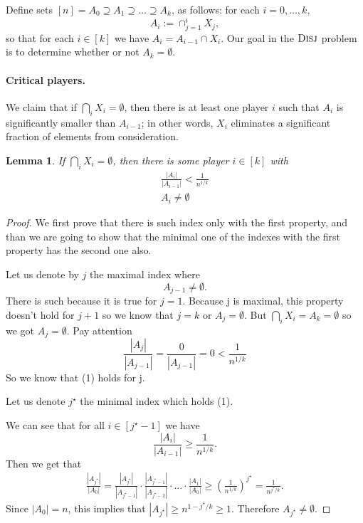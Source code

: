 \documentclass{article}
\newcommand{\coloneq}{:=}
\newcommand{\prob}[1]{\ensuremath{\text{\textsc{#1}}}}
\theoremstyle{plain}
\newtheorem{lemma}[theorem]{Lemma}
\begin{document}
Define  sets $[n] = A_0 \supseteq A_1 \supseteq \ldots \supseteq A_k$, as follows:
for each $i = 0,\ldots,k$,
\begin{equation*}
  A_i \coloneq \cap_{j = 1}^i X_j,
\end{equation*}
so that for each $i \in [k]$ we have $A_i = A_{i-1} \cap X_i$.
Our goal in the $\prob{Disj}$ problem is to determine whether or not $A_k = \emptyset$.

\paragraph{Critical players.}
We claim that if $\bigcap_i X_i = \emptyset$, then there is at least one player $i$ such that $A_i$ is significantly smaller than $A_{i - 1}$;
in other words, $X_i$ eliminates a significant fraction of elements from consideration.
\begin{lemma}
  If $\bigcap_i X_i = \emptyset$,
  then there is some player $i \in [k]$
  with
  \begin{align}
    \frac{|A_{i}|}{|A_{i-1}|} < \frac{1}{n^{1/k}} \\
    A_{i} \neq \emptyset
  \end{align}
  \label{lemma:narrow}
\end{lemma}
\begin{proof}
    We first prove that there is such index only with the first property, and than we are going to show that the minimal one of the indexes with the first property has the second one also.

  Let us denote by $j$ the maximal index where 
  \begin{equation*}
    A_{j-1} \neq \emptyset.
  \end{equation*}
  There is such because it is true for $j=1$. \newline
  Because j is maximal, this property doesn't hold for $j+1$ so we know that $j=k$ or $A_j = \emptyset$. But $\bigcap_i X_i = A_k = \emptyset$ so we got $A_j = \emptyset$. 
  Pay attention
  \begin{equation*}
    \frac{|A_j|}{|A_{j-1}|} = \frac{0}{|A_{j-1}|} = 0 < \frac{1}{n^{1/k}}
  \end{equation*}
  So we know that (1) holds for j.
  
  Let us denote $j^\star$ the minimal index which holds (1).
  
  We can see that for all $i \in [j^\star-1]$ we have
  \begin{equation*}
    \frac{|A_i|}{|A_{i-1}|} \geq \frac{1}{n^{1/k}}.
  \end{equation*}
  Then we get that
  \begin{align*}
    \frac{|A_{j^\star}|}{|A_0|} = 
    \frac{|A_{j^\star}|}{|A_{j^\star-1}|} \cdot \frac{|A_{j^\star-1}|}{|A_{j^\star-2}|} \cdot \ldots \cdot \frac{|A_1|}{|A_0|}
    \geq
    \left(  \frac{1}{n^{1/k}} \right)^{j^\star}
    =
    \frac{1}{n^{j^\star/k}}.
  \end{align*}
  Since $|A_0| = n$, this implies that $|A_{j^\star}| \geq n^{1-j^\star/k} \geq 1$. Therefore $A_{j^\star} \neq \emptyset$.
\end{proof}
\end{document}
